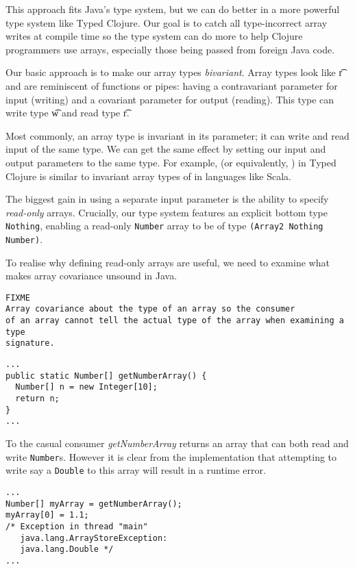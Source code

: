 This approach fits Java's type system, but we can do better in a more powerful
type system like Typed Clojure. Our goal is to catch all type-incorrect array
writes at compile time so the type system can do more to help Clojure programmers
use arrays, especially those being passed from foreign Java code.

Our basic approach is to make our array types \emph{bivariant}. Array types
look like { {\t{r}}} and
are reminiscent of functions or pipes: having a contravariant parameter for input (writing)
and a covariant parameter for output (reading).
This type can write type {\t{w}} and read type {\t{r}}.

Most commonly, an array type is invariant in its parameter; it can
write and read input of the same type.
We can get the same effect by setting our input and output
parameters to the same type. For example, {\ArrayTwo {\Number} {\Number}}
(or equivalently, {\Array {\Number}})
in Typed Clojure is similar to invariant array types of \Number in languages like Scala.

The biggest gain in using a separate input parameter is the ability
to specify \emph{read-only} arrays. Crucially, our type system features an
explicit bottom type \lstinline|Nothing|, enabling a read-only \lstinline|Number| array
to be of type \lstinline|(Array2 Nothing Number)|.

To realise why defining read-only arrays are useful, we need to examine
what makes array covariance unsound in Java.
\begin{verbatim}
FIXME
Array covariance about the type of an array so the consumer
of an array cannot tell the actual type of the array when examining a type
signature.
\end{verbatim}

\begin{lstlisting}
...
public static Number[] getNumberArray() {
  Number[] n = new Integer[10];
  return n;
}
...
\end{lstlisting}

To the casual consumer \emph{getNumberArray} returns an array that can both
read and write \lstinline|Number|s. However it is clear from the implementation
that attempting to write say a \lstinline|Double| to this array will result
in a runtime error.

\begin{verbatim}
...
Number[] myArray = getNumberArray();
myArray[0] = 1.1;
/* Exception in thread "main" 
   java.lang.ArrayStoreException: 
   java.lang.Double */
...
\end{verbatim}

